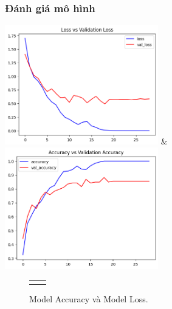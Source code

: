 \subsubsection{Đánh giá mô hình}
		\includegraphics[width=0.5\textwidth]{Figures/loss_conv.png} \&
		\includegraphics[width=0.5\textwidth]{Figures/val_conv.png}
\begin{figure}[h!] 
	\begin{tabular}{cc}
		\centering
    
	\end{tabular}
	\caption[Model Accuracy và Model Loss.]{Model Accuracy và Model Loss.}
	\label{fig:modelloss_and_Model Accuracy}
\end{figure}

